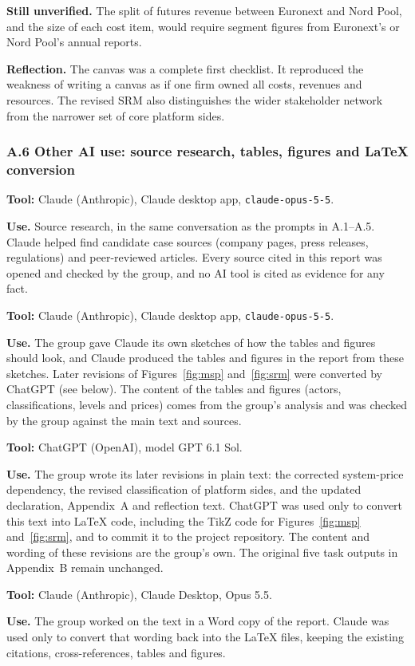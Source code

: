 \textbf{Still unverified.} The split of futures revenue
between Euronext and Nord Pool, and the size of each cost
item, would require segment figures from Euronext's or Nord
Pool's annual reports.

\textbf{Reflection.}
The canvas was a complete first checklist.
It reproduced the weakness of writing a canvas
as if one firm owned all costs, revenues and resources.
The revised SRM also distinguishes the wider stakeholder
network from the narrower set of core platform sides.

\subsubsection*{A.6 Other AI use: source research, tables, figures and LaTeX conversion}

\textbf{Tool:} Claude (Anthropic), Claude desktop app,
\texttt{claude-opus-5-5}.

\textbf{Use.} Source research, in the same conversation as
the prompts in A.1--A.5. Claude helped find candidate case
sources (company pages, press releases, regulations) and
peer-reviewed articles. Every source cited in this report was
opened and checked by the group, and no AI tool is cited as
evidence for any fact.

\textbf{Tool:} Claude (Anthropic), Claude desktop app,
\texttt{claude-opus-5-5}.

\textbf{Use.} The group gave Claude its own sketches of how
the tables and figures should look, and Claude produced the
tables and figures in the report from these sketches.
Later revisions of Figures~\ref{fig:msp} and~\ref{fig:srm}
were converted by ChatGPT (see below). The content of the
tables and figures (actors, classifications, levels and
prices) comes from the group's analysis and was checked by
the group against the main text and sources.

\textbf{Tool:} ChatGPT (OpenAI), model GPT 6.1 Sol.

\textbf{Use.} The group wrote its later revisions in plain text:
the corrected system-price dependency,
the revised classification of platform sides,
and the updated declaration, Appendix~A and reflection text.
ChatGPT was used only to convert this text into LaTeX code,
including the TikZ code for Figures~\ref{fig:msp}
and~\ref{fig:srm}, and to commit it to the project repository.
The content and wording of these revisions are the group's own.
The original five task outputs in Appendix~B
remain unchanged.

\textbf{Tool:} Claude (Anthropic), Claude Desktop, Opus 5.5.

\textbf{Use.} The group worked on the text in a Word
copy of the report. Claude was used only
to convert that wording back into the LaTeX files, keeping the
existing citations, cross-references, tables and figures.

